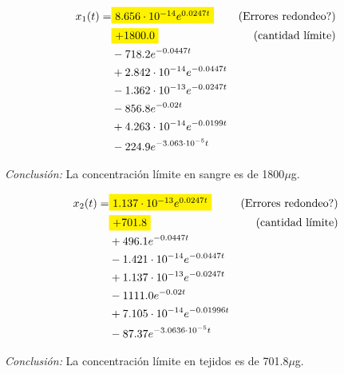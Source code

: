 \begin{ejemplo}{}
    \begin{eqnarray*}
       x_1(t)=& \tikz[baseline]{
                                \node[fill=yellow, rectangle,anchor=base] (A)
                      {\textcolor{black}%
                      {$8.656 \cdot 10^{-14} e^{0.0247 t}$}}
                      }&\text{(Errores redondeo?)}
                      \\
              &
              \tikz[baseline]{
                                \node[fill=yellow, rectangle,anchor=base] (A)
                      {\textcolor{black}%
                      {$+ 1800.0$}}}& \text{(cantidad límite)} \\
              &- 718.2 e^{- 0.0447 t}&\\ 
              &+ 2.842 \cdot 10^{-14} e^{- 0.0447 t}&\\
              &- 1.362 \cdot 10^{-13} e^{- 0.0247 t}&\\
              &- 856.8 e^{- 0.02 t} &\\
              &+ 4.263 \cdot 10^{-14} e^{- 0.0199 t}& \\
              &- 224.9 e^{- 3.063 \cdot 10^{-5} t}&\\
    \end{eqnarray*}
    

  
 

\emph{Conclusión:} La concentración límite en sangre es de 1800$\mu$g.


 

    \begin{eqnarray*}
       x_2(t)=&\tikz[baseline]{
                                \node[fill=yellow, rectangle,anchor=base] (A)
                      {\textcolor{black}%
                      {$1.137 \cdot 10^{-13} e^{0.0247 t}$}}
                      }&\text{(Errores redondeo?)}
                \\
               & 
               \tikz[baseline]{
                                \node[fill=yellow, rectangle,anchor=base] (A)
                      {\textcolor{black}%
                      {$+ 701.8$}}}& \text{(cantidad límite)} \\               
               & + 496.1 e^{- 0.0447 t}&\\
               &- 1.421 \cdot 10^{-14} e^{- 0.0447 t}&\\
               &+ 1.137 \cdot 10^{-13} e^{- 0.0247 t}&\\
               &- 1111.0 e^{- 0.02 t}&\\
               &+ 7.105 \cdot 10^{-14} e^{- 0.01996 t}&\\
               &- 87.37 e^{- 3.0636 \cdot 10^{-5} t}&
    \end{eqnarray*}
 
\emph{Conclusión:} La concentración límite en tejidos es de 701.8$\mu$g.
  
 


\end{ejemplo}









